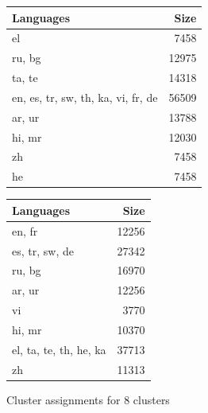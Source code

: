 \begin{figure}[ht]
    \centering
    
    \begin{subtable}{0.49\textwidth}
        \centering
        \begin{tabular}{lr}
            \toprule
            Languages & Size \\
            \midrule
            el & 7458 \\
            ru, bg & 12975 \\
            ta, te & 14318 \\
            en, es, tr, sw, th, ka, vi, fr, de & 56509 \\
            ar, ur & 13788 \\
            hi, mr & 12030 \\
            zh & 7458 \\
            he & 7458 \\
            \bottomrule
            \end{tabular}
        \caption{\citet{chung_improving_2020}}
        \label{tab:chung_clusters_k4}
        

    \end{subtable}
    \hfill
    \begin{subtable}{0.49\textwidth}
        \centering
        \begin{tabular}{lr}
            \toprule
            Languages & Size \\
            \midrule
            en, fr & 12256 \\
            es, tr, sw, de & 27342 \\
            ru, bg & 16970 \\
            ar, ur & 12256 \\
            vi & 3770 \\
            hi, mr & 10370 \\
            el, ta, te, th, he, ka & 37713 \\
            zh & 11313 \\
            \bottomrule
        \end{tabular}
        \caption{\citet{liang_xlm-v_2023}}
        \label{tab:liang_clusters_k4}
    \end{subtable}

    \caption{Cluster assignments for 8 clusters}
    \label{fig:multiple_tables}
\end{figure}
